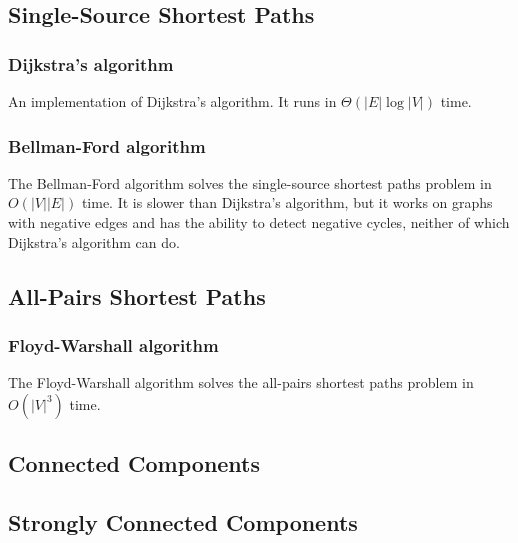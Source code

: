\documentclass[10pt,a4paper,titlepage]{article}
\begin{document}

\subsection{Single-Source Shortest Paths}
\subsubsection{Dijkstra's algorithm}
An implementation of Dijkstra's algorithm. It runs in $\Theta(|E|\log{|V|})$ time.


\subsubsection{Bellman-Ford algorithm}
The Bellman-Ford algorithm solves the single-source shortest paths problem in $O(|V||E|)$ time. It is slower than Dijkstra's algorithm, but it works on graphs with negative edges and has the ability to detect negative cycles, neither of which Dijkstra's algorithm can do.

\subsection{All-Pairs Shortest Paths}
\subsubsection{Floyd-Warshall algorithm}
The Floyd-Warshall algorithm solves the all-pairs shortest paths problem in $O(|V|^3)$ time.

\subsection{Connected Components}
\subsection{Strongly Connected Components}
\end{document}
